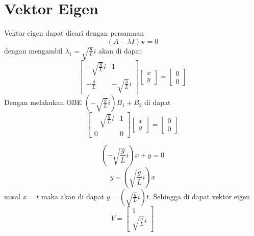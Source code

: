 \documentclass{article}
\begin{document}
\section{Vektor Eigen}
Vektor eigen dapat dicari dengan persamaan \[
    (A - \lambda I) \mathbf{v} = 0
\]
dengan mengambil ${\lambda}_1 = \sqrt{\frac{g}{L}}i$ akan di dapat
\[
    \begin{bmatrix}
        -\sqrt{\frac{g}{L}}i & 1                    \\
        -\frac{g}{L}         & -\sqrt{\frac{g}{L}}i
    \end{bmatrix}
    \begin{bmatrix}
        x \\
        y
    \end{bmatrix}
    = \begin{bmatrix}
        0 \\
        0
    \end{bmatrix}
\]
Dengan melakukan OBE $(-\sqrt{\frac{g}{L}}i)B_1 + B_2$ di dapat
\[
    \begin{bmatrix}
        -\sqrt{\frac{g}{L}}i & 1 \\
        0                    & 0
    \end{bmatrix}
    \begin{bmatrix}
        x \\
        y
    \end{bmatrix}
    = \begin{bmatrix}
        0 \\
        0
    \end{bmatrix}
\]

\[ (-\sqrt{\frac{g}{L}}i)x + y = 0
\]
\[
    y = (\sqrt{\frac{g}{L}}i)x
\]
misal $x=t$ maka akan di dapat $y =(\sqrt{\frac{g}{L}}i)t $. Sehingga di dapat vektor eigen
\[
    V = \begin{bmatrix}
        1 \\
        \sqrt{\frac{g}{L}}i
    \end{bmatrix}
\]
\end{document}
